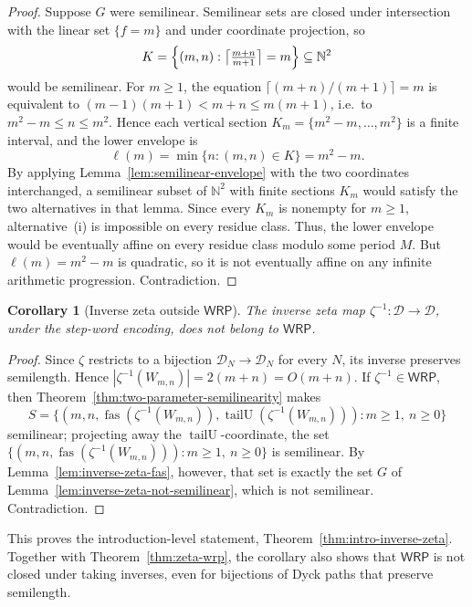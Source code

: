\documentclass[11pt]{article}
\newtheorem{corollary}[theorem]{Corollary}
\theoremstyle{definition}
\newcommand{\D}{\mathcal D}
\newcommand{\N}{\mathbb N}
\newcommand{\WRP}{\mathsf{WRP}}
\newcommand{\fas}{\operatorname{fas}}
\newcommand{\tailU}{\operatorname{tailU}}
\begin{document}
\begin{proof}
Suppose $G$ were semilinear.  Semilinear sets are closed under intersection
with the linear set $\{f=m\}$ and under coordinate projection, so
\[
   K=\Bigl\{(m,n):\bigl\lceil\tfrac{m+n}{m+1}\bigr\rceil=m\Bigr\}\subseteq\N^2
\]
would be semilinear.  For $m\ge 1$, the equation
$\lceil (m+n)/(m+1)\rceil=m$ is equivalent to
$(m-1)(m+1)<m+n\le m(m+1)$, i.e.\ to $m^2-m\le n\le m^2$.  Hence each
vertical section $K_m=\{m^2-m,\ldots,m^2\}$ is a finite interval, and the
lower envelope is
\[
   \ell(m)=\min\{n:(m,n)\in K\}=m^2-m.
\]
By applying Lemma~\ref{lem:semilinear-envelope} with the two coordinates
interchanged, a semilinear subset of $\N^2$ with finite sections $K_m$ would
satisfy the two alternatives in that lemma.  Since every $K_m$ is nonempty for
$m\ge1$, alternative~(i) is impossible on every residue class.  Thus, the lower
envelope would be eventually affine on every residue class modulo some period
$M$.  But $\ell(m)=m^2-m$ is quadratic, so it is not eventually affine on any
infinite arithmetic progression.  Contradiction.
\end{proof}

\begin{corollary}[Inverse zeta outside $\WRP$]
\label{cor:inverse-zeta-not-wrp}
The inverse zeta map $\zeta^{-1}\colon\D\to\D$, under the step-word
encoding, does not belong to $\WRP$.
\end{corollary}

\begin{proof}
Since $\zeta$ restricts to a bijection $\D_N\to\D_N$ for every $N$, its inverse
preserves semilength.  Hence $|\zeta^{-1}(W_{m,n})|=2(m+n)=O(m+n)$.  If
$\zeta^{-1}\in\WRP$, then Theorem~\ref{thm:two-parameter-semilinearity}
makes
\[
   S=\bigl\{(m,n,\fas(\zeta^{-1}(W_{m,n})),\tailU(\zeta^{-1}(W_{m,n}))):
              m\ge 1,\ n\ge 0\bigr\}
\]
semilinear; projecting away the $\tailU$-coordinate, the set
$\{(m,n,\fas(\zeta^{-1}(W_{m,n}))):m\ge1,\ n\ge0\}$ is semilinear.  By
Lemma~\ref{lem:inverse-zeta-fas}, however, that set is exactly the set $G$ of
Lemma~\ref{lem:inverse-zeta-not-semilinear}, which is not semilinear.
Contradiction.
\end{proof}

This proves the introduction-level statement,
Theorem~\ref{thm:intro-inverse-zeta}.
Together with Theorem~\ref{thm:zeta-wrp}, the corollary also shows that
$\WRP$ is not closed under taking inverses, even for bijections of Dyck paths
that preserve semilength.
\end{document}
